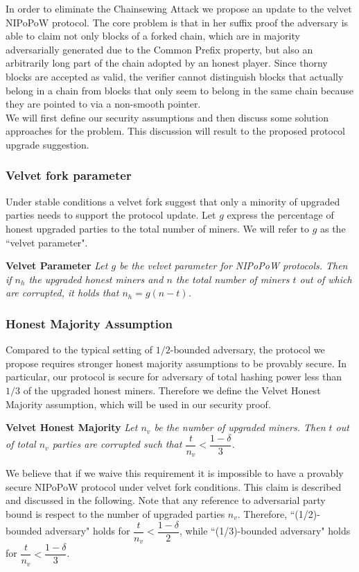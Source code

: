 In order to eliminate the Chainsewing Attack we propose an update to the velvet
NIPoPoW protocol. The core problem is that in her suffix proof the adversary
is able to claim not only blocks of a forked chain,  which are in majority adversarially
generated due to the Common Prefix property, but also an arbitrarily long part of the
chain adopted by an honest player. Since thorny blocks are accepted as valid,
the verifier cannot distinguish blocks that actually belong in a chain from
blocks that only seem to belong in the same chain because they are pointed to
via a non-smooth pointer. \\

We will first define our security assumptions and then discuss some solution
approaches for the problem. This discussion will result to the proposed protocol
upgrade suggestion.

\subsubsection{Velvet fork parameter}
Under stable conditions a velvet fork suggest that only a minority of upgraded parties needs to support the protocol update. Let $g$ express the percentage of honest upgraded parties to the total number of miners. We will refer to $g$ as the ``velvet parameter".

\begin{defn}{\textbf{Velvet Parameter}}
	\textit{Let $g$ be the velvet parameter for NIPoPoW protocols.  Then if $n_h$ the upgraded honest miners and $n$ the total number of miners $t$ out of which are corrupted, it holds that $n_h = g (n - t)$.}
	\label{defn:velvet_honest_majority}
\end{defn}

\subsubsection{Honest Majority Assumption}
Compared to the typical setting of $1/2$-bounded adversary, the protocol we
propose requires stronger honest majority assumptions to be provably secure. 
In particular, our protocol is secure for adversary of total hashing power 
less than $1/3$ of the upgraded honest miners. Therefore we define the Velvet
Honest Majority assumption, which will be used in our security proof.

\begin{defn}{\textbf{Velvet Honest Majority}}
	\textit{Let $n_v$ be the number of upgraded miners. Then $t$ out of total $n_v$
	parties are corrupted such that $\dfrac{t}{n_v} < \dfrac{1 - \delta}{3} $. }
	\label{defn:velvet_honest_majority}
\end{defn}
We believe that if we waive this requirement it is impossible to have a provably 
secure NIPoPoW protocol under velvet fork conditions.
This claim is described and discussed in the following.
Note that any reference to adversarial party bound is respect to the number of
upgraded parties $n_v$. Therefore, ``(1/2)-bounded adversary" holds for
$\dfrac{t}{n_v} < \dfrac{1 - \delta}{2} $, while ``(1/3)-bounded adversary" holds for
$\dfrac{t}{n_v} < \dfrac{1 - \delta}{3} $.

